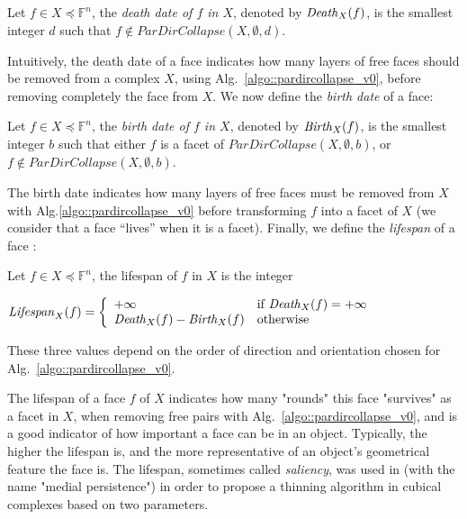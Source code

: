 \documentclass[final,envcountsame]{llncs}
\def\myem#1{{\em #1}}
\def\quotes#1{``#1''}
\def\birth#1#2{\mbox{\it{}Birth\/}_{#2}(#1)}
\def\death#1#2{\mbox{\it{}Death\/}_{#2}(#1)}
\def\lifespan#1#2{\mbox{\it{}Lifespan\/}_{#2}(#1)}
\def\allfaces#1{\mathbb{F}^{#1}}
\def\subcomplex#1#2{#1 \preceq #2}
\def\complex#1#2{\subcomplex{#2}{\allfaces{#1}}}
\begin{document}
\begin{definition}
Let $f \in \complex{n}{X}$, the \myem{death date of $f$ in $X$}, denoted by $\death{f}{X}$, is the smallest integer $d$ such that $f \notin ParDirCollapse(X, \emptyset, d)$. 
\end{definition}

Intuitively, the death date of a face indicates how many layers of free faces should be removed from a complex $X$, using Alg.~\ref{algo::pardircollapse_v0}, before removing completely the face from $X$. We now define the \myem{birth date} of a face:

\begin{definition}
Let $f \in \complex{n}{X}$, the \myem{birth date of $f$ in $X$}, denoted by $\birth{f}{X}$, is the smallest integer $b$ such that either $f$ is a facet of $ParDirCollapse(X, \emptyset, b)$, or $f \notin ParDirCollapse(X, \emptyset, b)$.
\end{definition}

The birth date indicates how many layers of free faces must be removed from $X$ with Alg.\ref{algo::pardircollapse_v0} before transforming $f$ into a facet of $X$ (we consider that a face \quotes{lives} when it is a facet).
Finally, we define the \myem{lifespan} of a face :

\begin{definition}
Let $f \in \complex{n}{X}$, the lifespan of $f$ in $X$ is the integer 

\begin{math}
\lifespan{f}{X} = \left\{
\begin{array}{ll}
+\infty & \text{if $\death{f}{X}=+\infty$}\\
\death{f}{X} - \birth{f}{X} & \text{otherwise}
\end{array}
\right.
\end{math}
\end{definition}

These three values depend on the order of direction and orientation chosen for Alg.~\ref{algo::pardircollapse_v0}.

The lifespan of a face $f$ of $X$ indicates how many "rounds" this face "survives" as a facet in $X$, when removing free pairs with Alg.~\ref{algo::pardircollapse_v0}, and is a good indicator of how important a face can be in an object. Typically, the higher the lifespan is, and the more representative of an object's geometrical feature the face is. The lifespan, sometimes called \myem{saliency}, was used in \cite{Liu2009} (with the name "medial persistence") in order to propose a thinning algorithm in cubical complexes based on two parameters.
\end{document}

